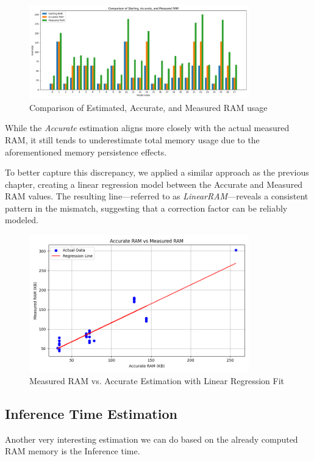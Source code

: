 \begin{figure}[ht]
  \centering
  \includegraphics[width=0.85\textwidth]{Pictures/InitialAccurateMeasured.png}
  \caption{Comparison of Estimated, Accurate, and Measured RAM usage}
  \label{fig:initial-ram-comparison}
\end{figure}

While the \textit{Accurate} estimation aligns more closely with the actual measured RAM, it still tends to underestimate total memory usage due to the aforementioned memory persistence effects.

To better capture this discrepancy, we applied a similar approach as the previous chapter, creating a linear regression model between the Accurate and Measured RAM values. The resulting line—referred to as \textit{LinearRAM}—reveals a consistent pattern in the mismatch, suggesting that a correction factor can be reliably modeled.

\begin{figure}[ht]
  \centering
  \includegraphics[width=0.85\textwidth]{Pictures/ram_accurate_vs_measured.png}
  \caption{Measured RAM vs. Accurate Estimation with Linear Regression Fit}
  \label{fig:ram-linear-regression}
\end{figure}


\clearpage


\subsection{Inference Time Estimation}
Another very interesting estimation we can do based on the already computed RAM memory is the Inference time.

